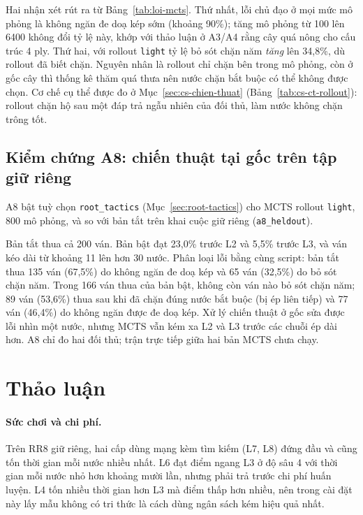 Hai nhận xét rút ra từ Bảng~\ref{tab:loi-mcts}. Thứ nhất, lỗi chủ đạo ở mọi mức mô phỏng là không ngăn đe doạ kép sớm (khoảng 90\%); tăng mô phỏng từ 100 lên 6400 không đổi tỷ lệ này, khớp với thảo luận ở A3/A4 rằng cây quá nông cho cấu trúc 4 ply. Thứ hai, với rollout \texttt{light} tỷ lệ bỏ sót chặn năm \emph{tăng} lên 34{,}8\%, dù rollout đã biết chặn. Nguyên nhân là rollout chỉ chặn bên trong mô phỏng, còn ở gốc cây thì thống kê thăm quá thưa nên nước chặn bắt buộc có thể không được chọn. Cơ chế cụ thể được đo ở Mục~\ref{sec:cs-chien-thuat}
(Bảng~\ref{tab:cs-ct-rollout}): rollout chặn hộ sau một đáp trả ngẫu nhiên của đối thủ, làm nước không chặn trông tốt.

\subsection{Kiểm chứng A8: chiến thuật tại gốc trên tập giữ riêng}
A8 bật tuỳ chọn \texttt{root\_tactics} (Mục~\ref{sec:root-tactics}) cho MCTS rollout \texttt{light}, 800 mô phỏng, và so với bản tắt trên khai cuộc giữ riêng (\texttt{a8\_heldout}).

Bản tắt thua cả 200 ván. Bản bật đạt 23{,}0\% trước L2 và 5{,}5\% trước L3, và ván kéo dài từ khoảng 11 lên hơn 30 nước. Phân loại lỗi bằng cùng script: bản tắt thua 135 ván (67{,}5\%) do không ngăn đe doạ kép và 65 ván (32{,}5\%) do bỏ sót chặn năm. Trong 166 ván thua của bản bật, không còn ván nào bỏ sót chặn năm; 89 ván (53{,}6\%) thua sau khi đã chặn đúng nước bắt buộc (bị ép liên tiếp) và 77 ván (46{,}4\%) do không ngăn được đe doạ kép. Xử lý chiến thuật ở gốc sửa được lỗi nhìn một nước, nhưng MCTS vẫn kém xa L2 và L3 trước các chuỗi ép dài hơn. A8 chỉ đo hai đối thủ; trận trực tiếp giữa hai bản MCTS chưa chạy.






\section{Thảo luận}
\paragraph{Sức chơi và chi phí.} Trên RR8 giữ riêng, hai cấp dùng mạng kèm tìm kiếm (L7, L8) đứng đầu và cũng tốn thời gian mỗi nước nhiều nhất. L6 đạt điểm ngang L3 ở độ sâu 4 với thời gian mỗi nước nhỏ hơn khoảng mười lần, nhưng phải trả trước chi phí huấn luyện. L4 tốn nhiều thời gian hơn L3 mà điểm thấp hơn nhiều, nên trong cài đặt này lấy mẫu không có tri thức là cách dùng ngân sách kém hiệu quả nhất.

